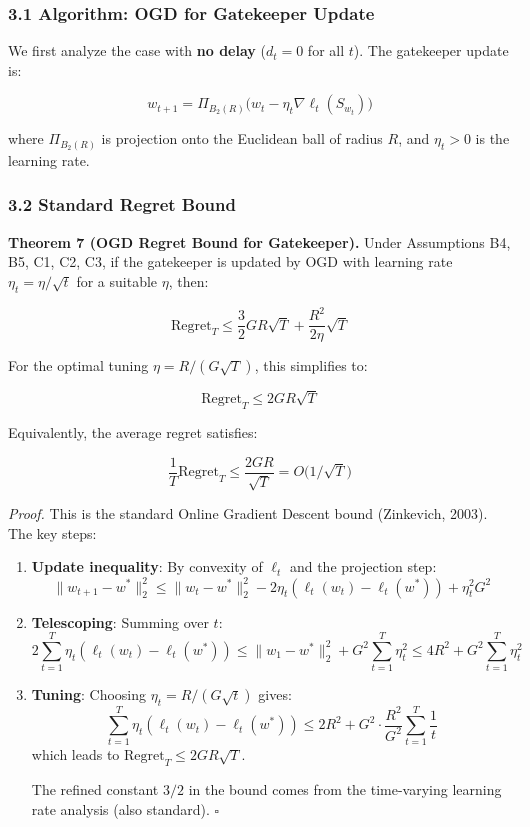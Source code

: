 \documentclass[
  12pt,
]{ctexart}
\begin{document}
\subsubsection{3.1 Algorithm: OGD for Gatekeeper
Update}\label{algorithm-ogd-for-gatekeeper-update}

We first analyze the case with \textbf{no delay} (\(d_t = 0\) for all
\(t\)). The gatekeeper update is:

\[w_{t+1} = \Pi_{B_2(R)}\bigl( w_t - \eta_t \nabla \ell_t(S_{w_t}) \bigr)\]

where \(\Pi_{B_2(R)}\) is projection onto the Euclidean ball of radius
\(R\), and \(\eta_t > 0\) is the learning rate.

\subsubsection{3.2 Standard Regret Bound}\label{standard-regret-bound}

\textbf{Theorem 7 (OGD Regret Bound for Gatekeeper).} Under Assumptions
B4, B5, C1, C2, C3, if the gatekeeper is updated by OGD with learning
rate \(\eta_t = \eta/\sqrt{t}\) for a suitable \(\eta\), then:

\[\text{Regret}_T \leq \frac{3}{2} GR \sqrt{T} + \frac{R^2}{2\eta} \sqrt{T}\]

For the optimal tuning \(\eta = R/(G\sqrt{T})\), this simplifies to:

\[\boxed{\;\text{Regret}_T \leq 2GR\sqrt{T}\;}\]

Equivalently, the average regret satisfies:

\[\frac{1}{T} \text{Regret}_T \leq \frac{2GR}{\sqrt{T}} = O\bigl(1/\sqrt{T}\bigr)\]

\emph{Proof.} This is the standard Online Gradient Descent bound
(Zinkevich, 2003). The key steps:

\begin{enumerate}
\def\labelenumi{\arabic{enumi}.}
\item
  \textbf{Update inequality}: By convexity of \(\ell_t\) and the
  projection step:
  \[\|w_{t+1} - w^*\|_2^2 \leq \|w_t - w^*\|_2^2 - 2\eta_t(\ell_t(w_t) - \ell_t(w^*)) + \eta_t^2 G^2\]
\item
  \textbf{Telescoping}: Summing over \(t\):
  \[2\sum_{t=1}^T \eta_t(\ell_t(w_t) - \ell_t(w^*)) \leq \|w_1 - w^*\|_2^2 + G^2\sum_{t=1}^T \eta_t^2 \leq 4R^2 + G^2\sum_{t=1}^T \eta_t^2\]
\item
  \textbf{Tuning}: Choosing \(\eta_t = R/(G\sqrt{t})\) gives:
  \[\sum_{t=1}^T \eta_t(\ell_t(w_t) - \ell_t(w^*)) \leq 2R^2 + G^2 \cdot \frac{R^2}{G^2} \sum_{t=1}^T \frac{1}{t}\]
  which leads to \(\text{Regret}_T \leq 2GR\sqrt{T}\).

  The refined constant \(3/2\) in the bound comes from the time-varying
  learning rate analysis (also standard). \(\square\)
\end{enumerate}
\end{document}
